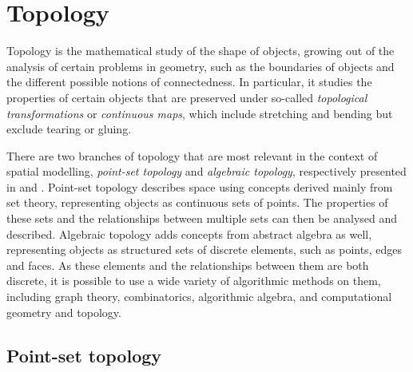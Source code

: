 \section{Topology}
\label{se:topology}

Topology is the mathematical study of the shape of objects, growing out of the analysis of certain problems in geometry, such as the boundaries of objects and the different possible notions of connectedness.
In particular, it studies the properties of certain objects that are preserved under so-called \emph{topological transformations} or \emph{continuous maps}, which include stretching and bending but exclude tearing or gluing.

There are two branches of topology that are most relevant in the context of spatial modelling, \emph{point-set topology} and \emph{algebraic topology}, respectively presented in  and .
Point-set topology describes space using concepts derived mainly from set theory, representing objects as continuous sets of points.
The properties of these sets and the relationships between multiple sets can then be analysed and described.
Algebraic topology adds concepts from abstract algebra as well, representing objects as structured sets of discrete elements, such as points, edges and faces.
As these elements and the relationships between them are both discrete, it is possible to use a wide variety of algorithmic methods on them, including graph theory, combinatorics, algorithmic algebra, and computational geometry and topology.

\subsection{Point-set topology}
\label{ss:point-set-topology}

